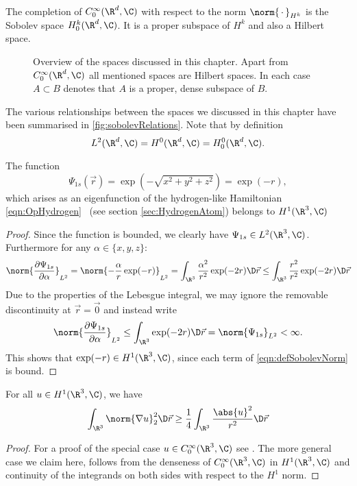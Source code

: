 \begin{defn}
	The completion of $C^\infty_0(\R^d, \C)$
	with respect to the norm $\norm{\slot}_{H^k}$
	is the Sobolev space $H^k_0(\R^d, \C)$.
	It is a proper subspace of $H^k$ and also a Hilbert space.
\end{defn}

\begin{figure}
	\centering
	\caption{Overview of the spaces discussed in this chapter.
		Apart from $C^\infty_0(\R^d, \C)$ all mentioned spaces are Hilbert spaces.
		In each case $A \subset B$ denotes that $A$ is a proper, dense
		subspace of $B$.}
	\label{fig:sobolevRelations}
\end{figure}
The various relationships between the spaces we discussed
in this chapter have been summarised in \fig \vref{fig:sobolevRelations}.
Note that by definition
\[ L^2(\R^d, \C) = H^0(\R^d, \C) = H^0_0(\R^d, \C). \]

\begin{exmp}
	\label{exmp:H1sH1}
	The function
	\[ \Psi_{1s}(\vec{r}) = \exp\left(- \sqrt{x^2 + y^2 + z^2} \right) = \exp(-r), \]
	which arises as an eigenfunction
	of the hydrogen-like Hamiltonian \eqref{eqn:OpHydrogen}%
	~(see section \vref{sec:HydrogenAtom})
	belongs to $H^1(\R^3, \C)$
	\begin{proof}
	Since the function is bounded, we clearly have $\Psi_{1s} \in L^2(\R^3, \C)$.
	Furthermore for any $\alpha \in \{x, y, z\}$:
	\begin{equation}
		\norm{ \frac{\partial \Psi_{1s}}{\partial \alpha} }_{L^2}
		= \norm{ - \frac{\alpha}{r} \exp(-r) }_{L^2}
		= \int_{\R^3} \frac{\alpha^2}{r^2} \exp(-2r) \D\vec{r}
		\leq \int_{\R^3} \frac{r^2}{r^2} \exp(-2r) \D\vec{r}
		\label{eqn:ProofH1sH1}
	\end{equation}
	Due to the properties of the Lebesgue integral,
	we may ignore the removable discontinuity at $\vec{r} = \vec{0}$
	and instead write
	\[ \norm{ \frac{\partial \Psi_{1s}}{\partial \alpha} }_{L^2}
		\leq \int_{\R^3} \exp(-2r) \D\vec{r} = \norm{\Psi_{1s}}_{L^2} < \infty. \]
	This shows that $\exp(-r) \in H^1(\R^3, \C)$,
	since each term of \eqref{eqn:defSobolevNorm} is bound.
	\end{proof}
\end{exmp}

\begin{prop}
	\label{prop:Hardy}
	For all $u \in H^1(\R^3, \C)$, we have
	\[ \int_{\R^3} \norm{\nabla u}_2^2 \D\vec{r}
		\geq \frac{1}{4} \int_{\R^3} \frac{\abs{u}^2}{r^2} \D\vec{r} \]
	\begin{proof}
		For a proof of the special case $u \in C_0^\infty(\R^3, \C)$
		see \cite[p. 30]{Helffer2013}.
		The more general case we claim here,
		follows from the denseness of $C_0^\infty(\R^3, \C)$ in $H^1(\R^3, \C)$
		and continuity of the integrands on both sides
		with respect to the $H^1$ norm.
	\end{proof}
\end{prop}


